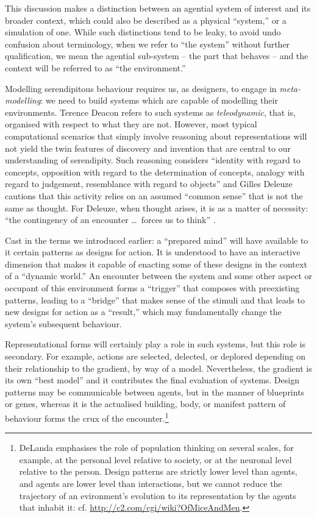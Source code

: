 \documentclass{llncs}
\begin{document}
This discussion makes a distinction between an agential system of
interest and its broader context, which could also be described as a
physical ``system,'' or a simulation of one.  While such distinctions
tend to be leaky, to avoid undo confusion about terminology, when we
refer to ``the system'' without further qualification, we mean the
agential sub-system -- the part that behaves -- and the context will
be referred to as ``the environment.''

Modelling serendipitous behaviour requires us, as designers, to engage
in \emph{meta-modelling}: we need to build systems which are capable
of modelling their environments.  Terence Deacon
\cite{deacon2006emergence} refers to such systems as
\emph{teleodynamic}, that is, organised with respect to what they are
not.
%
However, most typical computational scenarios that simply involve reasoning
about representations will not yield the twin features of discovery
and invention that are central to our understanding of serendipity.
Such reasoning considers
%
``identity with regard to concepts, opposition with regard to the determination of concepts, analogy with regard to judgement, resemblance with regard to objects''
%
and Gilles Deleuze \cite[p. 174]{deleuze1994difference} cautions that
this activity relies on an assumed ``common sense'' that is not the
same as thought.  For Deleuze, when thought arises, it is as a matter
of necessity: ``the contingency of an encounter \ldots\ forces us to
think'' \cite[p. 176]{deleuze1994difference}.

Cast in the terms we introduced earlier: a ``prepared mind'' will have
available to it certain patterns as designs for action.  It is
understood to have an interactive dimension that makes it capable of
enacting some of these designs in the context of a ``dynamic world.''
An encounter between the system and some other aspect or occupant of
this environment forms a ``trigger'' that composes with preexisting
patterns, leading to a ``bridge'' that makes sense of the stimuli and
that leads to new designs for action as a ``result,'' which may
fundamentally change the system's subsequent behaviour.

Representational forms will certainly play a role in such systems, but
this role is secondary.  For example, actions are selected, delected,
or deplored depending on their relationship to the gradient, by way of
a model.  Nevertheless, the gradient is its own ``best model'' and it
contributes the final evaluation of systems.
%
Design patterns may be communicable between agents, but in the manner
of blueprints or genes, whereas it is the actualised building, body,
or manifest pattern of behaviour forms the crux of the
encounter.\footnote{DeLanda \cite{delanda1993virtual} emphasises the
  role of population thinking on several scales, for example, at the
  personal level relative to society, or at the neuronal level
  relative to the person.  Design patterns are strictly lower level
  than agents, and agents are lower level than interactions, but we
  cannot reduce the trajectory of an evironment's evolution to its
  representation by the agents that inhabit it: cf.
  \url{http://c2.com/cgi/wiki?OfMiceAndMen}.}
\end{document}
